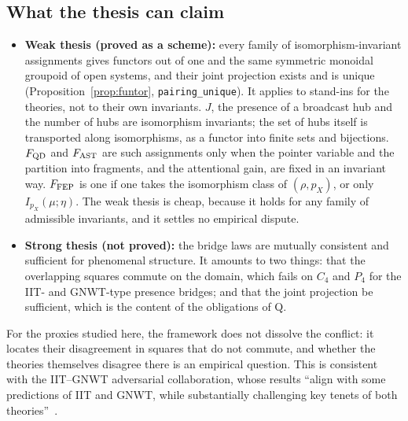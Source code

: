 \subsection{What the thesis can claim}\label{sec:tesis}
\begin{itemize}
\item \textbf{Weak thesis (proved as a scheme):} every family of isomorphism-invariant assignments gives functors out of one and the same symmetric monoidal groupoid of open systems, and their joint projection exists and is unique (Proposition~\ref{prop:funtor}, \texttt{pairing\_unique}). It applies to stand-ins for the theories, not to their own invariants. $J$, the presence of a broadcast hub and the number of hubs are isomorphism invariants; the set of hubs itself is transported along isomorphisms, as a functor into finite sets and bijections. $F_{\rm QD}$ and $F_{\rm AST}$ are such assignments only when the pointer variable and the partition into fragments, and the attentional gain, are fixed in an invariant way. $F_{\rm FEP}$ is one if one takes the isomorphism class of $(\rho,p_X)$, or only $I_{p_X}(\mu;\eta)$. The weak thesis is cheap, because it holds for any family of admissible invariants, and it settles no empirical dispute.
\item \textbf{Strong thesis (not proved):} the bridge laws are mutually consistent and sufficient for phenomenal structure. It amounts to two things: that the overlapping squares commute on the domain, which fails on $C_4$ and $P_4$ for the IIT- and GNWT-type presence bridges; and that the joint projection be sufficient, which is the content of the obligations of Q.
\end{itemize}
For the proxies studied here, the framework does not dissolve the conflict: it locates their disagreement in squares that do not commute, and whether the theories themselves disagree there is an empirical question. This is consistent with the IIT--GNWT adversarial collaboration, whose results ``align with some predictions of IIT and GNWT, while substantially challenging key tenets of both theories''~\cite[abstract]{Cogitate2025}.
